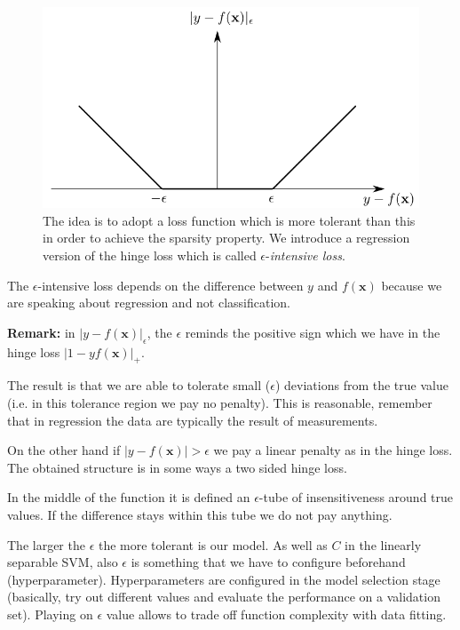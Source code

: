 \begin{figure}
    \centering
    \includegraphics[scale=0.5]{images/insensitive_loss.png}
    \caption{The idea is to adopt a loss function which is more tolerant than this in order to achieve the sparsity property. We introduce a regression version of the hinge loss which is called $\epsilon$-\textit{intensive loss}.}
    \label{fig:insensitive_loss}
\end{figure}

The $\epsilon$-intensive loss depends on the difference between $y$ and $f(\pmb{x})$ because we are speaking about regression and not classification. \newline

\textbf{Remark:} in $|y - f(\pmb{x})|_\epsilon$, the $\epsilon$ reminds the positive sign which we have in the hinge loss $|1 - yf(\pmb{x})|_+$. \newline

The result is that we are able to tolerate small ($\epsilon$) deviations from the true value (i.e. in this tolerance region we pay no penalty). This is reasonable, remember that in regression the data are typically the result of measurements. \newline

On the other hand if $|y-f(\pmb{x})|>\epsilon$ we pay a linear penalty as in the hinge loss. The obtained structure is in some ways a two sided hinge loss. \newline

In the middle of the function it is defined an $\epsilon$-tube of insensitiveness around true values. If the difference stays within this tube we do not pay anything. \newline

The larger the $\epsilon$ the more tolerant is our model. As well as $C$ in the linearly separable SVM, also $\epsilon$ is something that we have to configure beforehand (hyperparameter). Hyperparameters are configured in the model selection stage (basically, try out different values and evaluate the performance on a validation set). Playing on $\epsilon$ value allows to trade off function complexity with data fitting.

